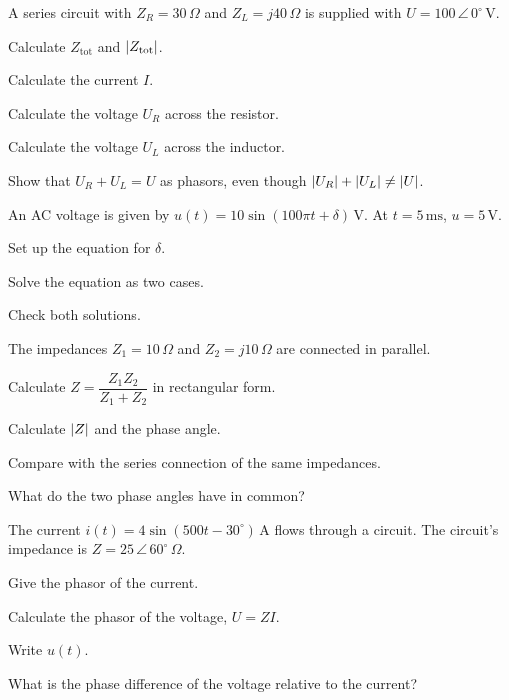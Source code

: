 A series circuit with $Z_R = 30\,\Omega$ and $Z_L = j40\,\Omega$ is supplied with
$U = 100\,\angle\,0^{\circ}\,\text{V}$.
\begin{parts}
  \item Calculate $Z_{\text{tot}}$ and $\lvert Z_{\text{tot}}\rvert$.
  \item Calculate the current $I$.
  \item Calculate the voltage $U_R$ across the resistor.
  \item Calculate the voltage $U_L$ across the inductor.
  \item Show that $U_R + U_L = U$ as phasors, even though $\lvert U_R\rvert + \lvert U_L\rvert \neq \lvert U\rvert$.
\end{parts}

An AC voltage is given by $u(t) = 10\sin(100\pi t + \delta)\,\text{V}$. At $t = 5\,\text{ms}$,
$u = 5\,\text{V}$.
\begin{parts}
  \item Set up the equation for $\delta$.
  \item Solve the equation as two cases.
  \item Check both solutions.
\end{parts}

The impedances $Z_1 = 10\,\Omega$ and $Z_2 = j10\,\Omega$ are connected in parallel.
\begin{parts}
  \item Calculate $Z = \dfrac{Z_1Z_2}{Z_1 + Z_2}$ in rectangular form.
  \item Calculate $\lvert Z\rvert$ and the phase angle.
  \item Compare with the series connection of the same impedances.
  \item What do the two phase angles have in common?
\end{parts}

The current $i(t) = 4\sin(500t - 30^{\circ})\,\text{A}$ flows through a circuit. The circuit's
impedance is $Z = 25\,\angle\,60^{\circ}\,\Omega$.
\begin{parts}
  \item Give the phasor of the current.
  \item Calculate the phasor of the voltage, $U = ZI$.
  \item Write $u(t)$.
  \item What is the phase difference of the voltage relative to the current?
\end{parts}

